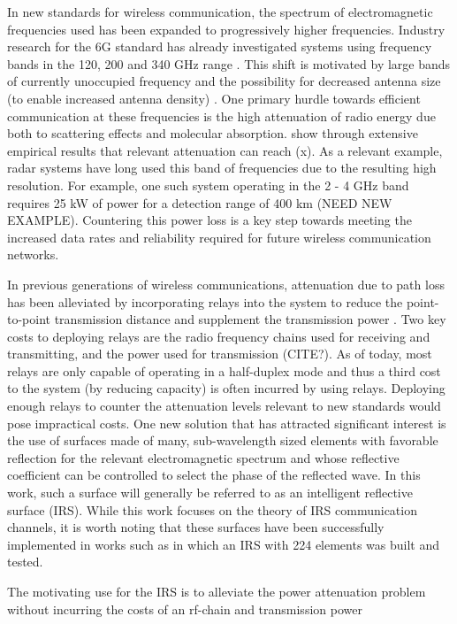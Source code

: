 In new standards for wireless communication, the spectrum of electromagnetic frequencies used has been expanded to progressively higher frequencies. Industry research for the 6G standard has already investigated systems using frequency bands in the 120, 200 and 340 GHz range \cite{Koziol}. This shift is motivated by large bands of currently unoccupied frequency and the possibility for decreased antenna size (to enable increased antenna density) \cite{akyildiz2018combating}. One primary hurdle towards efficient communication at these frequencies is the high attenuation of radio energy due both to scattering effects and molecular absorption. \cite{TODO} show through extensive empirical results that relevant attenuation can reach (x). 
As a relevant example, radar systems have long used this band of frequencies due to the resulting high resolution. For example, one such system operating in the 2 - 4 GHz band requires 25 kW of power for a detection range of 400 km \cite{TODO} (NEED NEW EXAMPLE). 
Countering this power loss is a key step towards meeting the increased data rates and reliability required for future wireless communication networks. 
\par
In previous generations of wireless communications, attenuation due to path loss has been alleviated by incorporating relays into the system to reduce the point-to-point transmission distance and supplement the transmission power \cite{dahlman20134g}. Two key costs to deploying relays are the radio frequency chains used for receiving and transmitting, and the power used for transmission (CITE?). As of today, most relays are only capable of operating in a half-duplex mode and thus a third cost to the system (by reducing capacity) is often incurred by using relays. Deploying enough relays to counter
the attenuation levels relevant to new standards would pose impractical costs. One new solution that has attracted significant interest is the use of surfaces made of many, sub-wavelength sized elements with favorable reflection for the relevant electromagnetic spectrum and whose reflective coefficient can be controlled to select the phase of the reflected wave. In this work, such a surface will generally be referred to as an intelligent reflective surface (IRS).
While this work focuses on the theory of IRS communication channels, it is worth noting that these surfaces have been successfully implemented in works such as \cite{tan2018enabling} in which an IRS with 224 elements was built and tested. 
\par
The motivating use for the IRS is to alleviate the power attenuation problem without incurring the costs of an rf-chain and transmission power 
